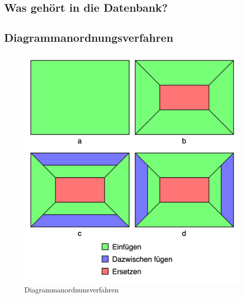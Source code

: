 \subsection{Was gehört in die Datenbank?}
\label{subsec:wasgehoertindiedatenbank}


\subsection{Diagrammanordnungsverfahren}
\label{subsec:diagrammanordnungsverfahren}

\begin{figure}
    \label{figure:diagrammanordnungsverfahren}
    \begin{center}
    \includegraphics[scale=0.2]{img/abbildungen/DiagrammanordnungsverfahrenMitLegende}
    \end{center}
    \caption{Diagrammanordnunsverfahren}
\end{figure}


